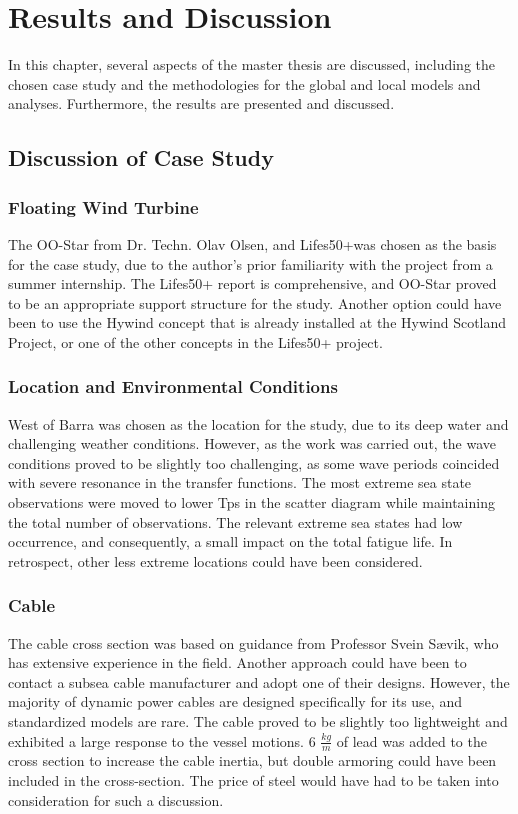 \chapter{Results and Discussion}
\label{chap:discussion}
 In this chapter, several aspects of the master thesis are discussed, including the chosen case study and the methodologies for the global and local models and analyses. Furthermore, the results are presented and discussed. 
 \section{Discussion of Case Study}
 \subsection{Floating Wind Turbine}
The OO-Star from Dr. Techn. Olav Olsen, and Lifes50+was chosen as the basis for the case study, due to the author's prior familiarity with the project from a summer internship. The Lifes50+ report is comprehensive, and OO-Star proved to be an appropriate support structure for the study.  Another option could have been to use the Hywind concept that is already installed at the Hywind Scotland Project, or one of the other concepts in the Lifes50+ project.
\subsection{Location and Environmental Conditions}
West of Barra was chosen as the location for the study, due to its deep water and challenging weather conditions. However, as the work was carried out, the wave conditions proved to be slightly too challenging, as some wave periods coincided with severe resonance in the transfer functions. The most extreme sea state observations were moved to lower Tps in the scatter diagram while maintaining the total number of observations. The relevant extreme sea states had low occurrence, and consequently, a small impact on the total fatigue life. In retrospect, other less extreme locations could have been considered.
\subsection{Cable}
\label{sec:disccable}
The cable cross section was based on guidance from Professor Svein Sævik, who has extensive experience in the field. Another approach could have been to contact a subsea cable manufacturer and adopt one of their designs.  However, the majority of dynamic power cables are designed specifically for its use, and standardized models are rare. The cable proved to be slightly too lightweight and exhibited a large response to the vessel motions. 6 $\frac{kg}{m}$ of lead was added to the cross section to increase the cable inertia, but double armoring could have been included in the cross-section. The price of steel would have had to be taken into consideration for such a discussion.

